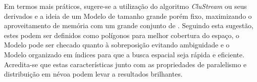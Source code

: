 Em termos mais práticos, sugere-se a utilização do algoritmo \emph{CluStream}
\cite{Aggarwal2003} ou seus derivados e a ideia de um Modelo de tamanho grande
porém fixo, maximizando o aproveitamento de memória com um grande conjunto de
\mclusters.
Seguindo esta sugestão, estes \mclusters podem ser definidos como polígonos para
melhor cobertura do espaço, o Modelo pode ser checado quanto à sobreposição
evitando ambiguidade e o Modelo organizado em índices para que a busca espacial
seja rápida e eficiente.
Acredita-se que estas características junto com as propriedades de paralelismo e
distribuição em névoa podem levar a resultados brilhantes.







